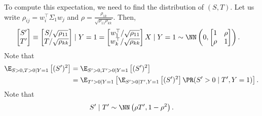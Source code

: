 \documentclass{article}
\begin{document}
To compute this expectation, we need to find the distribution of $(S, T)$.
Let us write $\rho_{ij} = w_i^\top \Sigma_1 w_j$ and $\rho = \frac{ \rho_{1k} }{ \sqrt{ \rho_{11} \rho_{kk} } }$.
Then,
\begin{align}
  \begin{bmatrix} S' \\ T' \end{bmatrix}
  &\equiv \begin{bmatrix} S / \sqrt{\rho_{11}} \\ T / \sqrt{\rho_{kk}} \end{bmatrix} \mid Y = 1
  = \begin{bmatrix} w_1^\top / \sqrt{\rho_{11}} \\ w_k^\top / \sqrt{\rho_{kk}} \end{bmatrix} X \mid Y = 1
  \sim \NN\left( 0, \begin{bmatrix} 1 & \rho \\ \rho & 1 \end{bmatrix} \right).
\end{align}
Note that 
\begin{align}
  \E_{S>0,T>0 \mid Y=1}\left[ (S')^2 \right]
  &= \E_{S'>0,T'>0 \mid Y=1}\left[ (S')^2 \right] \\
  &= \E_{T'>0 \mid Y=1}\left[ \E_{S'>0 \mid T', Y=1} \left[ (S')^2 \right] \PR( S' > 0 \mid T', Y = 1 ) \right].
\end{align}
Note that
\begin{align}
  S' \mid T' \sim \NN\left( \rho T', 1 - \rho^2 \right).
\end{align}
\end{document}
